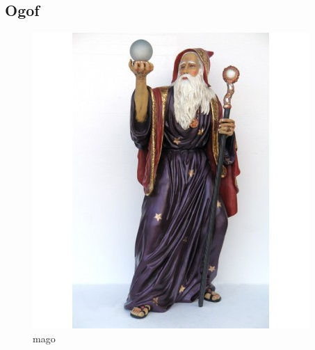 \subsection{Ogof}
\begin{figure}[htb]
	\caption{\label{mago}mago}
	\begin{center}
	    \includegraphics[width=\textwidth/2]{imagens/mago.jpg}
	\end{center}
\end{figure}

